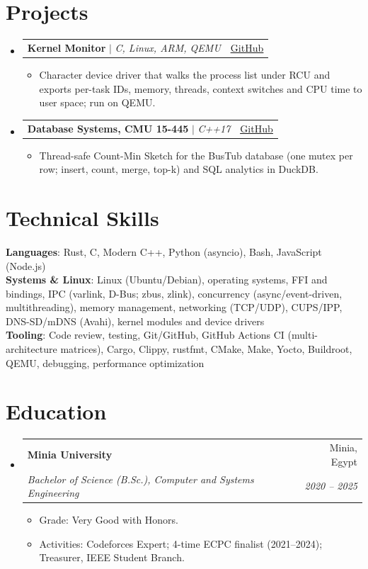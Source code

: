 \documentclass[letterpaper,11pt]{article}
\makeatletter
\newcommand{\resumeItem}[1]{
  \item\small{
    {#1 \vspace{-2pt}}
  }
}
\newcommand{\resumeSubheading}[4]{
  \vspace{-2pt}\item
    \begin{tabular*}{0.97\textwidth}[t]{l@{\extracolsep{\fill}}r}
      \textbf{#1} & #2 \\
      \textit{\small#3} & \textit{\small #4} \\
    \end{tabular*}\vspace{-7pt}
}
\newcommand{\resumeProjectHeading}[2]{
    \item
    \begin{tabular*}{0.97\textwidth}{l@{\extracolsep{\fill}}r}
      \small#1 & #2 \\
    \end{tabular*}\vspace{-7pt}
}
\newcommand{\resumeSubHeadingListStart}{\begin{itemize}[leftmargin=0.15in, label={}]}
\newcommand{\resumeSubHeadingListEnd}{\end{itemize}}
\newcommand{\resumeItemListStart}{\begin{itemize}}
\newcommand{\resumeItemListEnd}{\end{itemize}\vspace{-5pt}}
\newcommand{\cvlink}[2]{\href{#1}{\underline{#2}}}
\makeatother
\begin{document}
\section{Projects}
    \resumeSubHeadingListStart
      \resumeProjectHeading
          {\textbf{Kernel Monitor} $|$ \emph{C, Linux, ARM, QEMU}}{\cvlink{https://github.com/Abd002/kernel-monitor}{GitHub}}
          \resumeItemListStart
            \resumeItem{Character device driver that walks the process list under RCU and exports per-task IDs, memory, threads, context switches and CPU time to user space; run on QEMU.}
          \resumeItemListEnd
      \resumeProjectHeading
          {\textbf{Database Systems, CMU 15-445} $|$ \emph{C++17}}{\cvlink{https://github.com/Abd002/db-systems-journey}{GitHub}}
          \resumeItemListStart
            \resumeItem{Thread-safe Count-Min Sketch for the BusTub database (one mutex per row; insert, count, merge, top-k) and SQL analytics in DuckDB.}
          \resumeItemListEnd
    \resumeSubHeadingListEnd

%
\section{Technical Skills}
 \begin{itemize}[leftmargin=0.15in, label={}]
    \small{\item{
     \textbf{Languages}{: Rust, C, Modern C++, Python (asyncio), Bash, JavaScript (Node.js)} \\
     \textbf{Systems \& Linux}{: Linux (Ubuntu/Debian), operating systems, FFI and bindings, IPC (varlink, D-Bus; zbus, zlink), concurrency (async/event-driven, multithreading), memory management, networking (TCP/UDP), CUPS/IPP, DNS-SD/mDNS (Avahi), kernel modules and device drivers} \\
     \textbf{Tooling}{: Code review, testing, Git/GitHub, GitHub Actions CI (multi-architecture matrices), Cargo, Clippy, rustfmt, CMake, Make, Yocto, Buildroot, QEMU, debugging, performance optimization}
    }}
 \end{itemize}

\section{Education}
  \resumeSubHeadingListStart
    \resumeSubheading
      {Minia University}{Minia, Egypt}
      {Bachelor of Science (B.Sc.), Computer and Systems Engineering}{2020 -- 2025}
      \resumeItemListStart
        \resumeItem{Grade: Very Good with Honors.}
        \resumeItem{Activities: Codeforces Expert; 4-time ECPC finalist (2021--2024); Treasurer, IEEE Student Branch.}
      \resumeItemListEnd
  \resumeSubHeadingListEnd


\end{document}
